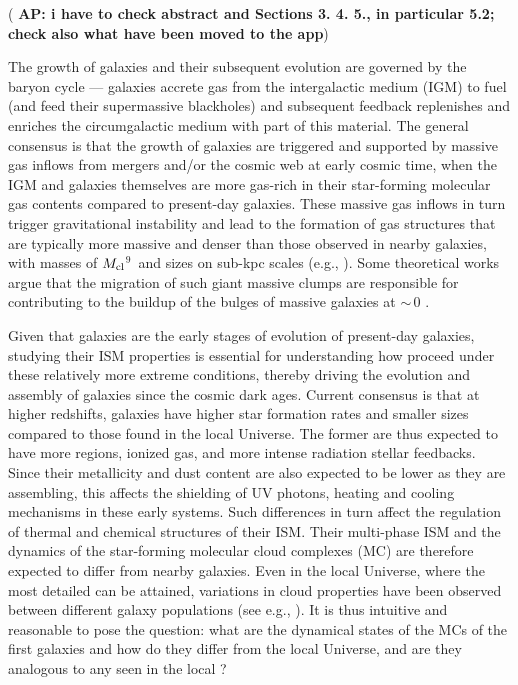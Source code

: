 \IfFileExists{emulateapjlegacy.cls}{\documentclass[iop]{emulateapjlegacy}}{\documentclass[iop]{emulateapj}}
\newcommand{\AP}[1]{({\bf \color{apcolor} AP: #1})}
\begin{document}
\AP{i have to check abstract and Sections 3. 4. 5., in particular 5.2; check also what have been moved to the app}

The growth of galaxies and their subsequent evolution are governed by the baryon cycle --- galaxies accrete gas from the intergalactic medium (IGM) to fuel \SF (and feed their supermassive blackholes) and subsequent feedback replenishes and enriches the circumgalactic medium with part of this material. The general consensus is that the growth of \highz galaxies are triggered and supported by massive gas inflows from mergers and/or the cosmic web at early cosmic time, when the IGM and galaxies themselves are more gas-rich in their star-forming molecular gas contents compared to present-day galaxies.
These massive gas inflows in turn trigger gravitational instability and lead
to the formation of gas structures that are typically more massive and denser than those
observed in nearby galaxies, with masses of $M_{\rm cl}$$^9$\,\Msun
and sizes on sub-kpc scales (e.g., \citealt{Gabor13a, Hopkins14a, Inoue16a}).
Some theoretical works argue that the
migration of such giant massive clumps are responsible for contributing to the
buildup of the bulges of massive galaxies at \z$\sim$\,0 \citep[e.g.,][]{Ceverino10a}.

Given that \highz galaxies are the early stages of evolution of present-day galaxies, studying their ISM properties is essential for understanding how \SF proceed under these relatively more extreme conditions, thereby driving the evolution and assembly
of galaxies
since the cosmic dark ages.
Current consensus is that at higher redshifts, galaxies have higher
star formation rates \citep[SFR; ][]{Behroozi13b, Sparre15a, Maiolino15a, Dunlop17a} and
smaller sizes \citep[e.g.,][]{Bouwens11a, Ono13a} compared to those found in the local Universe.
The former are thus expected to have more  regions, ionized gas, and more intense radiation stellar feedbacks.
Since their metallicity and dust content are also expected to be lower as they are assembling,
this affects the shielding of UV photons, heating and cooling mechanisms in these early systems. Such differences in turn
affect the regulation of thermal and chemical structures of their ISM.
Their multi-phase ISM and the dynamics of the star-forming molecular cloud complexes (MC)
are therefore expected to differ from nearby galaxies.
Even in the local Universe, where the most detailed \obs can be attained, variations in cloud properties have been
observed between different galaxy populations (see e.g., \citealt{Hughes10a, Hughes13b}).
It is thus intuitive and reasonable to pose the question: what are the dynamical states of the MCs of the first galaxies and
how do they differ from the local Universe, and are they analogous to any seen in the local \galpop?
%
\end{document}
